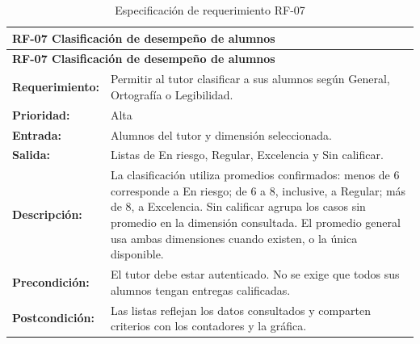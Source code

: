 \begin{longtable}{|p{3.2cm}|p{11.8cm}|}
\caption{Especificación de requerimiento RF-07}\label{tab:rf07} \\ \hline
\multicolumn{2}{|p{15cm}|}{\textbf{RF-07 Clasificación de desempeño de alumnos}} \\ \hline
\endfirsthead
\hline
\multicolumn{2}{|p{15cm}|}{\textbf{RF-07 Clasificación de desempeño de alumnos}} \\ \hline
\endhead
\textbf{Requerimiento:} & Permitir al tutor clasificar a sus alumnos según General, Ortografía o Legibilidad. \\ \hline
\textbf{Prioridad:} & Alta \\ \hline
\textbf{Entrada:} & Alumnos del tutor y dimensión seleccionada. \\ \hline
\textbf{Salida:} & Listas de En riesgo, Regular, Excelencia y Sin calificar. \\ \hline
\textbf{Descripción:} & La clasificación utiliza promedios confirmados: menos de 6 corresponde a En riesgo; de 6 a 8, inclusive, a Regular; más de 8, a Excelencia. Sin calificar agrupa los casos sin promedio en la dimensión consultada. El promedio general usa ambas dimensiones cuando existen, o la única disponible. \\ \hline
\textbf{Precondición:} & El tutor debe estar autenticado. No se exige que todos sus alumnos tengan entregas calificadas. \\ \hline
\textbf{Postcondición:} & Las listas reflejan los datos consultados y comparten criterios con los contadores y la gráfica. \\ \hline
\end{longtable}


